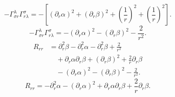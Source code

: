 \documentclass[11pt, a4paper]{report}
\begin{document}
\begin{equation}
-\Gamma^\lambda_{\sigma r} \Gamma^\sigma_{r\lambda} = -\left[ (\partial_r\alpha)^2 + (\partial_r\beta)^2 + \left(\frac{1}{r}\right)^2 + \left(\frac{1}{r}\right)^2 \right].
\end{equation}
\begin{equation}
-\Gamma^\lambda_{\sigma r} \Gamma^\sigma_{r\lambda} = -(\partial_r\alpha)^2 - (\partial_r\beta)^2 - \frac{2}{r^2}.
\end{equation}
\begin{align}
R_{rr} &= \partial_r^2\beta - \partial_r^2\alpha - \partial_r^2\beta + \frac{2}{r^2} \nonumber \\
&\quad + \partial_r\alpha\partial_r\beta + (\partial_r\beta)^2 + \frac{2}{r}\partial_r\beta \nonumber \\
&\quad - (\partial_r\alpha)^2 - (\partial_r\beta)^2 - \frac{2}{r^2}.
\end{align}
\begin{equation}
R_{rr} = -\partial_r^2\alpha - (\partial_r\alpha)^2 + \partial_r\alpha\partial_r\beta + \frac{2}{r}\partial_r\beta.
\end{equation}
\end{document}
